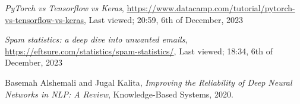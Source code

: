 \documentclass[lettersize,journal]{IEEEtran}
\begin{document}
\begin{thebibliography}{1}

{\it{PyTorch vs Tensorflow vs Keras}}, \href{https://www.datacamp.com/tutorial/pytorch-vs-tensorflow-vs-keras}{https://www.datacamp.com/tutorial/pytorch-vs-tensorflow-vs-keras}, Last viewed; 20:59, 6th of December, 2023

{\it{Spam statistics: a deep dive into unwanted emails}}, \href{https://eftsure.com/statistics/spam-statistics/}{https://eftsure.com/statistics/spam-statistics/}, Last viewed; 18:34, 6th of December, 2023

Basemah Alshemali and Jugal Kalita, {\it{Improving the Reliability of Deep Neural Networks in NLP: A Review}}, Knowledge-Based Systems, 2020.


\end{thebibliography}
\end{document}
